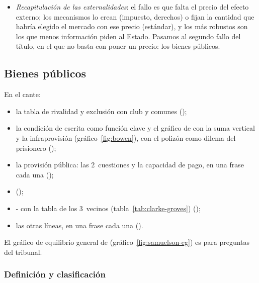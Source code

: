 \documentclass[11pt]{article}
\begin{document}
\begin{itemize}
\item \emph{Recapitulación de las externalidades}: el fallo es que falta el precio del efecto externo; los mecanismos lo crean (impuesto, derechos) o fijan la cantidad que habría elegido el mercado con ese precio (estándar), y los más robustos son los que menos información piden al Estado. Pasamos al segundo fallo del título, en el que no basta con poner un precio: los bienes públicos.
\end{itemize}


\subsection{Bienes públicos}\label{sec:bienes-publicos}

\begin{notaopositor}
En el cante:
\begin{itemize}
\item la tabla de rivalidad y exclusión con club y comunes ();
\item la condición de  escrita como función clave y el gráfico de  con la suma vertical y la infraprovisión (gráfico~\ref{fig:bowen}), con el polizón como dilema del prisionero ();
\item la provisión pública: las 2~cuestiones y la capacidad de pago, en una frase cada una ();
\item {} ();
\item {}- con la tabla de los 3~vecinos (tabla~\ref{tab:clarke-groves}) ();
\item las otras líneas, en una frase cada una ().
\end{itemize}
El gráfico de equilibrio general de  (gráfico~\ref{fig:samuelson-eg}) es para preguntas del tribunal.
\end{notaopositor}

\subsubsection{Definición y clasificación}\label{sec:bienes-publicos-definicion}
\end{document}
